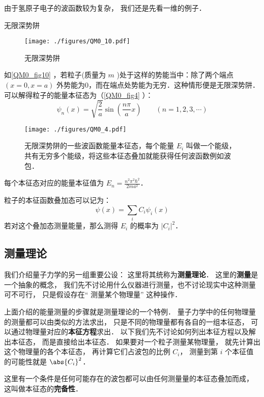 由于氢原子电子的波函数较为复杂， 我们还是先看一维的例子．

\begin{example}{无限深势阱}
\begin{figure}[ht]
\centering
\texttt{[image: ./figures/QM0\_10.pdf]}
\caption{无限深势阱} \label{QM0_fig10}
\end{figure}
如\autoref{QM0_fig10} ，若粒子(质量为 $m$ )处于这样的势能当中：除了两个端点 $(x=0,x=a)$ 外势能为0，而在端点处势能为无穷．这种情形便是无限深势阱． 可以解得粒子的能量本征态为（\autoref{QM0_fig4} ）：
\begin{equation}
\psi_n(x) = \sqrt{\frac{2}{a}}\sin(\frac{n\pi}{a}x) \qquad (n=1,2,3,\cdots)
\end{equation}
\begin{figure}[ht]
\centering
\texttt{[image: ./figures/QM0\_4.pdf]}
\caption{无限深势阱的一些波函数能量本征态，每个能量 $E_i$ 叫做一个能级，共有无穷多个能级，将这些本征态叠加就能获得任何波函数例如波包．} \label{QM0_fig4}
\end{figure}
每个本征态对应的能量本征值为 $E_n=\frac{n^2\pi^2\hbar^2}{2ma^2}$．

粒子的本征函数叠加态可以记为：
\begin{equation}
\psi(x) = \sum_i C_i\psi_i(x)
\end{equation}
若对这个叠加态测量能量，那么测得 $E_i$ 的概率为 $|C_i|^2$．
\end{example}


\subsection{测量理论}
我们介绍量子力学的另一组重要公设： 这里将其统称为\textbf{测量理论}． 这里的\textbf{测量}是一个抽象的概念， 我们先不讨论用什么仪器进行测量，也不讨论现实中这种测量可不可行， 只是假设存在“ 测量某个物理量” 这种操作．

上面介绍的能量测量的步骤就是测量理论的一个特例． 量子力学中的任何物理量的测量都可以由类似的方法求出， 只是不同的物理量都有各自的一组本征态， 可以通过物理量对应的\textbf{本征方程}求出． 以下我们先不讨论如何列出本征方程以及解出本征态， 而是直接给出本征态． 如果要对一个粒子测量某物理量， 就先计算出这个物理量的各个本征态， 再计算它们占波包的比例 $C_i$， 测量到第 $i$ 个本征值的可能性就是 $\abs{C_i}^2$．

这里有一个条件是任何可能存在的波包都可以由任何测量量的本征态叠加而成， 这叫做本征态的\textbf{完备性}．

